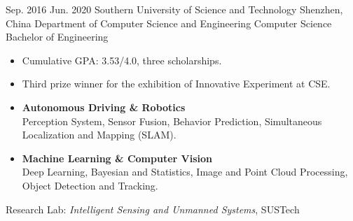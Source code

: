 \documentclass{resume}
\begin{document}
\makeheader

\begin{educations}
  \education%
    {Sep. 2016}%
    {Jun. 2020}%
    {Southern University of Science and Technology}%
    {Shenzhen, China}%
    {Department of Computer Science and Engineering}%
    {Computer Science}%
    {Bachelor of Engineering}%
	{\begin{itemize}%
		\item Cumulative GPA: 3.53/4.0, three scholarships.
		\item Third prize winner for the exhibition of Innovative Experiment at CSE.
	\end{itemize}}%
\end{educations}
	
\begin{itemize}
  \item \textbf{Autonomous Driving \& Robotics}\\
  	Perception System, Sensor Fusion, Behavior Prediction, Simultaneous Localization and Mapping (SLAM).
  \item \textbf{Machine Learning \& Computer Vision}\\
  	Deep Learning, Bayesian and Statistics, Image and Point Cloud Processing, Object Detection and Tracking.
\end{itemize}


Research Lab: \textit{Intelligent Sensing and Unmanned Systems}, SUSTech
\end{document}
